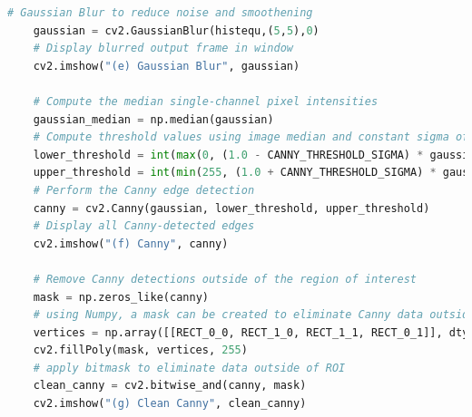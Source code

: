 \documentclass[10pt,conference]{IEEEtran}
\begin{document}
\begin{lstlisting}[language=Python,basicstyle=\tiny, showspaces=false, showstringspaces=false tabsize=1, breaklines=true]
    # Gaussian Blur to reduce noise and smoothening
    gaussian = cv2.GaussianBlur(histequ,(5,5),0)
    # Display blurred output frame in window
    cv2.imshow("(e) Gaussian Blur", gaussian)
    
    # Compute the median single-channel pixel intensities
    gaussian_median = np.median(gaussian)
    # Compute threshold values using image median and constant sigma offset
    lower_threshold = int(max(0, (1.0 - CANNY_THRESHOLD_SIGMA) * gaussian_median))
    upper_threshold = int(min(255, (1.0 + CANNY_THRESHOLD_SIGMA) * gaussian_median))
    # Perform the Canny edge detection
    canny = cv2.Canny(gaussian, lower_threshold, upper_threshold)
    # Display all Canny-detected edges
    cv2.imshow("(f) Canny", canny)

    # Remove Canny detections outside of the region of interest
    mask = np.zeros_like(canny)
    # using Numpy, a mask can be created to eliminate Canny data outside of POLY
    vertices = np.array([[RECT_0_0, RECT_1_0, RECT_1_1, RECT_0_1]], dtype=np.int32)
    cv2.fillPoly(mask, vertices, 255)
    # apply bitmask to eliminate data outside of ROI
    clean_canny = cv2.bitwise_and(canny, mask)
    cv2.imshow("(g) Clean Canny", clean_canny)


\end{lstlisting}
\end{document}
